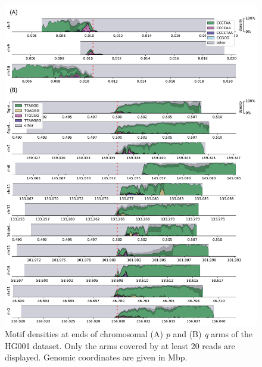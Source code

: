 \documentclass{article}
\begin{document}
\begin{figure}[ht!] \centering
\includegraphics[height=.95\textheight,width=\textwidth,keepaspectratio]{figures/HG001-densityplots.pdf}
\caption{
    Motif densities at ends of chromosomal (A) \textit{p} and (B) \textit{q} arms of the HG001 dataset.
    Only the arms covered by at least 20 reads are displayed.
    Genomic coordinates are given in Mbp.
}
\label{fig:hg001_densityplots}
\end{figure}
\clearpage \pagebreak
\end{document}

